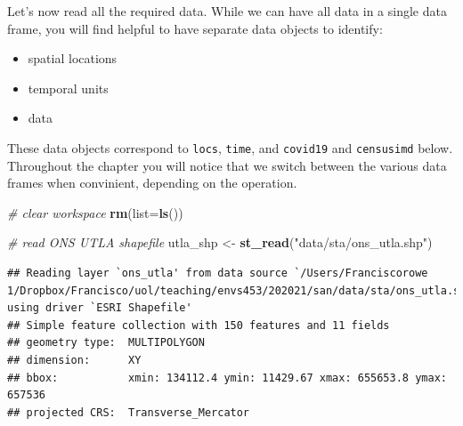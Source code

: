 \documentclass[
]{book}
\newenvironment{Shaded}{\begin{snugshade}}{\end{snugshade}}
\newcommand{\CommentTok}[1]{\textcolor[rgb]{0.56,0.35,0.01}{\textit{#1}}}
\newcommand{\DataTypeTok}[1]{\textcolor[rgb]{0.13,0.29,0.53}{#1}}
\newcommand{\KeywordTok}[1]{\textcolor[rgb]{0.13,0.29,0.53}{\textbf{#1}}}
\newcommand{\NormalTok}[1]{#1}
\newcommand{\OperatorTok}[1]{\textcolor[rgb]{0.81,0.36,0.00}{\textbf{#1}}}
\newcommand{\StringTok}[1]{\textcolor[rgb]{0.31,0.60,0.02}{#1}}
\begin{document}
Let's now read all the required data. While we can have all data in a single data frame, you will find helpful to have separate data objects to identify:

\begin{itemize}
\item
  spatial locations
\item
  temporal units
\item
  data
\end{itemize}

These data objects correspond to \texttt{locs}, \texttt{time}, and \texttt{covid19} and \texttt{censusimd} below. Throughout the chapter you will notice that we switch between the various data frames when convinient, depending on the operation.

\begin{Shaded}
\begin{Highlighting}[]
\CommentTok{# clear workspace}
\KeywordTok{rm}\NormalTok{(}\DataTypeTok{list=}\KeywordTok{ls}\NormalTok{())}

\CommentTok{# read ONS UTLA shapefile}
\NormalTok{utla_shp <-}\StringTok{ }\KeywordTok{st_read}\NormalTok{(}\StringTok{"data/sta/ons_utla.shp"}\NormalTok{) }
\end{Highlighting}
\end{Shaded}

\begin{verbatim}
## Reading layer `ons_utla' from data source `/Users/Franciscorowe 1/Dropbox/Francisco/uol/teaching/envs453/202021/san/data/sta/ons_utla.shp' using driver `ESRI Shapefile'
## Simple feature collection with 150 features and 11 fields
## geometry type:  MULTIPOLYGON
## dimension:      XY
## bbox:           xmin: 134112.4 ymin: 11429.67 xmax: 655653.8 ymax: 657536
## projected CRS:  Transverse_Mercator
\end{verbatim}

\begin{Shaded}
\end{Shaded}
\end{document}
